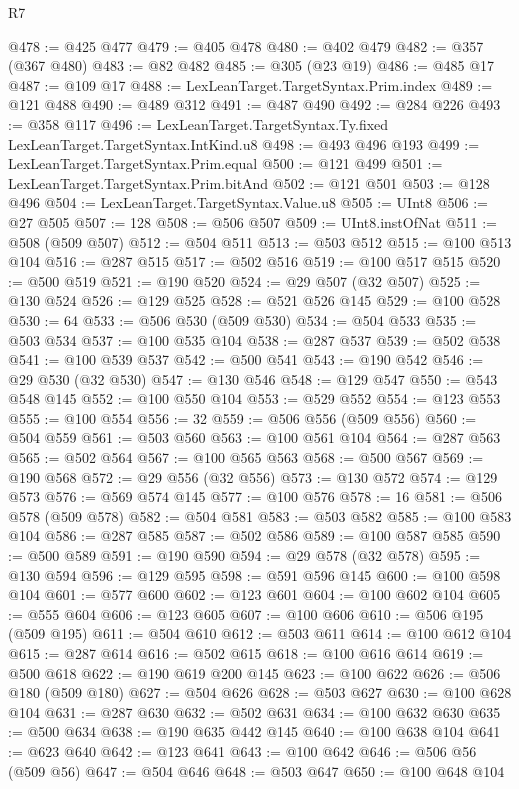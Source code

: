 \begin{lexlean}{R7}
\begin{coremodule}
@478 := @425 @477
@479 := @405 @478
@480 := @402 @479
@482 := @357 (@367 @480)
@483 := @82 @482
@485 := @305 (@23 @19)
@486 := @485 @17
@487 := @109 @17
@488 := LexLeanTarget.TargetSyntax.Prim.index
@489 := @121 @488
@490 := @489 @312
@491 := @487 @490
@492 := @284 @226
@493 := @358 @117
@496 := LexLeanTarget.TargetSyntax.Ty.fixed LexLeanTarget.TargetSyntax.IntKind.u8
@498 := @493 @496 @193
@499 := LexLeanTarget.TargetSyntax.Prim.equal
@500 := @121 @499
@501 := LexLeanTarget.TargetSyntax.Prim.bitAnd
@502 := @121 @501
@503 := @128 @496
@504 := LexLeanTarget.TargetSyntax.Value.u8
@505 := UInt8
@506 := @27 @505
@507 := 128
@508 := @506 @507
@509 := UInt8.instOfNat
@511 := @508 (@509 @507)
@512 := @504 @511
@513 := @503 @512
@515 := @100 @513 @104
@516 := @287 @515
@517 := @502 @516
@519 := @100 @517 @515
@520 := @500 @519
@521 := @190 @520
@524 := @29 @507 (@32 @507)
@525 := @130 @524
@526 := @129 @525
@528 := @521 @526 @145
@529 := @100 @528
@530 := 64
@533 := @506 @530 (@509 @530)
@534 := @504 @533
@535 := @503 @534
@537 := @100 @535 @104
@538 := @287 @537
@539 := @502 @538
@541 := @100 @539 @537
@542 := @500 @541
@543 := @190 @542
@546 := @29 @530 (@32 @530)
@547 := @130 @546
@548 := @129 @547
@550 := @543 @548 @145
@552 := @100 @550 @104
@553 := @529 @552
@554 := @123 @553
@555 := @100 @554
@556 := 32
@559 := @506 @556 (@509 @556)
@560 := @504 @559
@561 := @503 @560
@563 := @100 @561 @104
@564 := @287 @563
@565 := @502 @564
@567 := @100 @565 @563
@568 := @500 @567
@569 := @190 @568
@572 := @29 @556 (@32 @556)
@573 := @130 @572
@574 := @129 @573
@576 := @569 @574 @145
@577 := @100 @576
@578 := 16
@581 := @506 @578 (@509 @578)
@582 := @504 @581
@583 := @503 @582
@585 := @100 @583 @104
@586 := @287 @585
@587 := @502 @586
@589 := @100 @587 @585
@590 := @500 @589
@591 := @190 @590
@594 := @29 @578 (@32 @578)
@595 := @130 @594
@596 := @129 @595
@598 := @591 @596 @145
@600 := @100 @598 @104
@601 := @577 @600
@602 := @123 @601
@604 := @100 @602 @104
@605 := @555 @604
@606 := @123 @605
@607 := @100 @606
@610 := @506 @195 (@509 @195)
@611 := @504 @610
@612 := @503 @611
@614 := @100 @612 @104
@615 := @287 @614
@616 := @502 @615
@618 := @100 @616 @614
@619 := @500 @618
@622 := @190 @619 @200 @145
@623 := @100 @622
@626 := @506 @180 (@509 @180)
@627 := @504 @626
@628 := @503 @627
@630 := @100 @628 @104
@631 := @287 @630
@632 := @502 @631
@634 := @100 @632 @630
@635 := @500 @634
@638 := @190 @635 @442 @145
@640 := @100 @638 @104
@641 := @623 @640
@642 := @123 @641
@643 := @100 @642
@646 := @506 @56 (@509 @56)
@647 := @504 @646
@648 := @503 @647
@650 := @100 @648 @104

\end{coremodule}
\end{lexlean}
